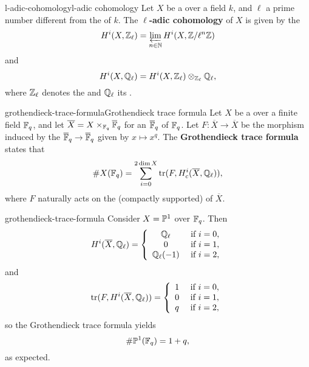 \begin{topic}{l-adic-cohomology}{l-adic cohomology}
    Let $X$ be a  over a field $k$, and $\ell$ a prime number different from the  of $k$. The \textbf{$\ell$-adic cohomology} of $X$ is given by the 
    \[ H^i(X, \mathbb{Z}_\ell) = \varprojlim_{n \in \mathbb{N}} H^i(X, \mathbb{Z}/\ell^n \mathbb{Z}) \]
    and
    \[ H^i(X, \mathbb{Q}_\ell) = H^i(X, \mathbb{Z}_\ell) \otimes_{\mathbb{Z}_\ell} \mathbb{Q}_\ell , \]
    where $\mathbb{Z}_\ell$ denotes the  and $\mathbb{Q}_\ell$ its .
\end{topic}

\begin{topic}{grothendieck-trace-formula}{Grothendieck trace formula}
    Let $X$ be a  over a finite field $\mathbb{F}_q$, and let $\overline{X} = X \times_{\mathbb{F}_q} \overline{\mathbb{F}}_q$ for an  $\overline{\mathbb{F}}_q$ of $\mathbb{F}_q$. Let $F : \overline{X} \to \overline{X}$ be the morphism induced by the  $\overline{\mathbb{F}}_q \to \overline{\mathbb{F}}_q$ given by $x \mapsto x^q$. The \textbf{Grothendieck trace formula} states that
    \[ \# X(\mathbb{F}_q) = \sum_{i = 0}^{2 \dim X} \operatorname{tr}(F, H^i_c(\overline{X}, \mathbb{Q}_\ell)) , \]
    where $F$ naturally acts on the (compactly supported)  of $\overline{X}$.
\end{topic}

\begin{example}{grothendieck-trace-formula}
    Consider $X = \mathbb{P}^1$ over $\mathbb{F}_q$. Then
    \[ H^i(\overline{X}, \mathbb{Q}_\ell) = \left\{ \begin{array}{cl}
        \mathbb{Q}_\ell & \textup{ if } i = 0, \\
        0 & \textup{ if } i = 1, \\
        \mathbb{Q}_\ell(-1) & \textup{ if } i = 2, \\
    \end{array} \right. \]
    and
    \[ \operatorname{tr}(F, H^i(\overline{X}, \mathbb{Q}_\ell)) = \left\{ \begin{array}{cl}
        1 & \textup{ if } i = 0, \\
        0 & \textup{ if } i = 1, \\
        q & \textup{ if } i = 2, \\
    \end{array} \right. \]
    so the Grothendieck trace formula yields
    \[ \# \mathbb{P}^1(\mathbb{F}_q) = 1 + q , \]
    as expected.
\end{example}

